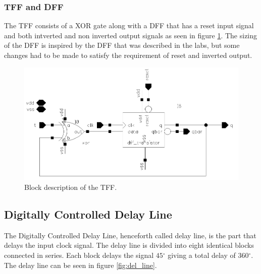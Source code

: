 \documentclass[a4paper,12pt]{article} \usepackage{graphicx}
\newcommand{\degree}{\ensuremath{^\circ}}
\begin{document}
\subsubsection{TFF and DFF}
The TFF consists of a XOR gate along with a DFF that has a reset input signal and
both intverted and non inverted output signals as seen in figure \ref{fig:counter_TFF}. The sizing of the DFF is inspired 
by the DFF that was described in the labs, but some changes had to be made to satisfy
the requirement of reset and inverted output.

\begin{figure}[h]
        \centering
        \includegraphics[width=\textwidth]{../Bilder/counter_6bit/counter_6bit_TFF.png}
        \caption{Block description of the TFF.}
        \label{fig:counter_TFF}
\end{figure}

\subsection{Digitally Controlled Delay Line}
The Digitally Controlled Delay Line, henceforth called delay line, is the part
that delays the input clock signal. The delay line is divided into eight
identical blocks connected in series. Each block delays
the signal 
$45\degree$ giving a total delay of 360\degree. The delay line can be seen in
figure \ref{fig:del_line}. 
\end{document}
